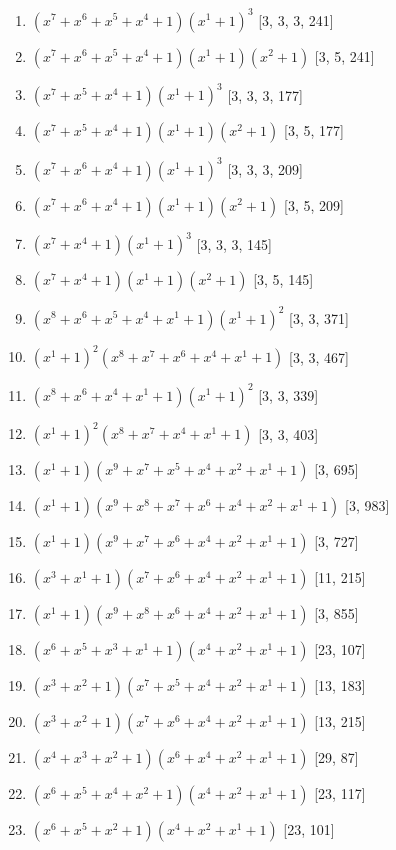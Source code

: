\documentclass[10pt,twocolumn]{article}
\begin{document}
\begin{enumerate}
\item $(x^{7} + x^{6} + x^{5} + x^{4} + 1)(x^{1} + 1)^{3}$  [3, 3, 3, 241]
\item $(x^{7} + x^{6} + x^{5} + x^{4} + 1)(x^{1} + 1)(x^{2} + 1)$  [3, 5, 241]
\item $(x^{7} + x^{5} + x^{4} + 1)(x^{1} + 1)^{3}$  [3, 3, 3, 177]
\item $(x^{7} + x^{5} + x^{4} + 1)(x^{1} + 1)(x^{2} + 1)$  [3, 5, 177]
\item $(x^{7} + x^{6} + x^{4} + 1)(x^{1} + 1)^{3}$  [3, 3, 3, 209]
\item $(x^{7} + x^{6} + x^{4} + 1)(x^{1} + 1)(x^{2} + 1)$  [3, 5, 209]
\item $(x^{7} + x^{4} + 1)(x^{1} + 1)^{3}$  [3, 3, 3, 145]
\item $(x^{7} + x^{4} + 1)(x^{1} + 1)(x^{2} + 1)$  [3, 5, 145]
\item $(x^{8} + x^{6} + x^{5} + x^{4} + x^{1} + 1)(x^{1} + 1)^{2}$  [3, 3, 371]
\item $(x^{1} + 1)^{2}(x^{8} + x^{7} + x^{6} + x^{4} + x^{1} + 1)$  [3, 3, 467]
\item $(x^{8} + x^{6} + x^{4} + x^{1} + 1)(x^{1} + 1)^{2}$  [3, 3, 339]
\item $(x^{1} + 1)^{2}(x^{8} + x^{7} + x^{4} + x^{1} + 1)$  [3, 3, 403]
\item $(x^{1} + 1)(x^{9} + x^{7} + x^{5} + x^{4} + x^{2} + x^{1} + 1)$  [3, 695]
\item $(x^{1} + 1)(x^{9} + x^{8} + x^{7} + x^{6} + x^{4} + x^{2} + x^{1} + 1)$  [3, 983]
\item $(x^{1} + 1)(x^{9} + x^{7} + x^{6} + x^{4} + x^{2} + x^{1} + 1)$  [3, 727]
\item $(x^{3} + x^{1} + 1)(x^{7} + x^{6} + x^{4} + x^{2} + x^{1} + 1)$  [11, 215]
\item $(x^{1} + 1)(x^{9} + x^{8} + x^{6} + x^{4} + x^{2} + x^{1} + 1)$  [3, 855]
\item $(x^{6} + x^{5} + x^{3} + x^{1} + 1)(x^{4} + x^{2} + x^{1} + 1)$  [23, 107]
\item $(x^{3} + x^{2} + 1)(x^{7} + x^{5} + x^{4} + x^{2} + x^{1} + 1)$  [13, 183]
\item $(x^{3} + x^{2} + 1)(x^{7} + x^{6} + x^{4} + x^{2} + x^{1} + 1)$  [13, 215]
\item $(x^{4} + x^{3} + x^{2} + 1)(x^{6} + x^{4} + x^{2} + x^{1} + 1)$  [29, 87]
\item $(x^{6} + x^{5} + x^{4} + x^{2} + 1)(x^{4} + x^{2} + x^{1} + 1)$  [23, 117]
\item $(x^{6} + x^{5} + x^{2} + 1)(x^{4} + x^{2} + x^{1} + 1)$  [23, 101]

\end{enumerate}
\end{document}
